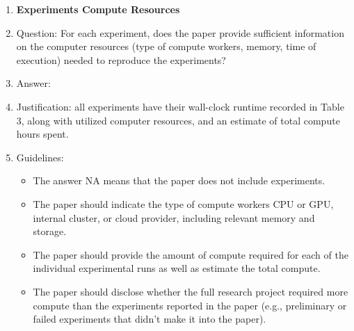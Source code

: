 \documentclass{article}
\begin{document}
\begin{enumerate}
\begin{itemize}
        \item The method for calculating the error bars should be explained (closed form formula, call to a library function, bootstrap, etc.)
        \item The assumptions made should be given (e.g., Normally distributed errors).
        \item It should be clear whether the error bar is the standard deviation or the standard error of the mean.
        \item It is OK to report 1-sigma error bars, but one should state it. The authors should preferably report a 2-sigma error bar than state that they have a 96\% CI, if the hypothesis of Normality of errors is not verified.
        \item For asymmetric distributions, the authors should be careful not to show in tables or figures symmetric error bars that would yield results that are out of range (e.g. negative error rates).
        \item If error bars are reported in tables or plots, The authors should explain in the text how they were calculated and reference the corresponding figures or tables in the text.
    \end{itemize}
\item {\bf Experiments Compute Resources}
    \item[] Question: For each experiment, does the paper provide sufficient information on the computer resources (type of compute workers, memory, time of execution) needed to reproduce the experiments?
    \item[] Answer: \answerYes{}
    \item[] Justification: all experiments have their wall-clock runtime recorded in Table 3, along with utilized computer resources, and an estimate of total compute hours spent.
    \item[] Guidelines:
    \begin{itemize}
        \item The answer NA means that the paper does not include experiments.
        \item The paper should indicate the type of compute workers CPU or GPU, internal cluster, or cloud provider, including relevant memory and storage.
        \item The paper should provide the amount of compute required for each of the individual experimental runs as well as estimate the total compute.
        \item The paper should disclose whether the full research project required more compute than the experiments reported in the paper (e.g., preliminary or failed experiments that didn't make it into the paper).

\end{itemize}
\end{enumerate}
\end{document}
